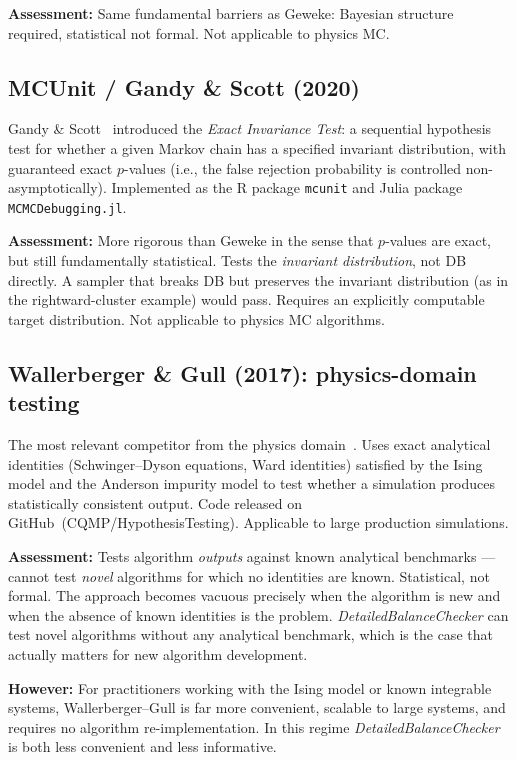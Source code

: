 \documentclass[11pt,a4paper]{article}
\newcommand{\DBC}{\textit{DetailedBalanceChecker}}
\begin{document}
\textbf{Assessment:}  Same fundamental barriers as Geweke: Bayesian structure
required, statistical not formal.  Not applicable to physics MC.

\subsection{MCUnit / Gandy \& Scott (2020)}

Gandy \& Scott~\cite{GandyScott2020} introduced the \emph{Exact Invariance Test}:
a sequential hypothesis test for whether a given Markov chain has a specified
invariant distribution, with guaranteed exact $p$-values (i.e., the false
rejection probability is controlled non-asymptotically).  Implemented as the R
package \texttt{mcunit} and Julia package \texttt{MCMCDebugging.jl}.

\textbf{Assessment:}  More rigorous than Geweke in the sense that $p$-values are
exact, but still fundamentally statistical.  Tests the \emph{invariant distribution},
not DB directly.  A sampler that breaks DB but preserves the invariant distribution
(as in the rightward-cluster example) would pass.  Requires an explicitly computable
target distribution.  Not applicable to physics MC algorithms.

\subsection{Wallerberger \& Gull (2017): physics-domain testing}

The most relevant competitor from the physics domain~\cite{WallerbergerGull2017}.
Uses exact analytical identities (Schwinger--Dyson equations, Ward identities)
satisfied by the Ising model and the Anderson impurity model to test whether a
simulation produces statistically consistent output.  Code released on
GitHub~(CQMP/HypothesisTesting).  Applicable to large production simulations.

\textbf{Assessment:}  Tests algorithm \emph{outputs} against known analytical
benchmarks — cannot test \emph{novel} algorithms for which no identities are
known.  Statistical, not formal.  The approach becomes vacuous precisely when the
algorithm is new and when the absence of known identities is the problem.
\DBC{} can test novel algorithms without any analytical benchmark, which is the
case that actually matters for new algorithm development.

\textbf{However:}  For practitioners working with the Ising model or known
integrable systems, Wallerberger--Gull is far more convenient, scalable to large
systems, and requires no algorithm re-implementation.  In this regime \DBC{} is
both less convenient and less informative.
\end{document}
